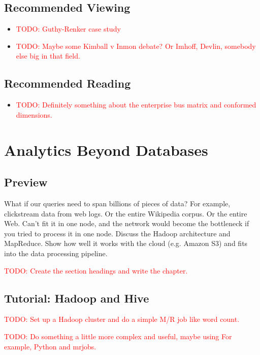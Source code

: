 \documentclass[11pt]{book}
\newcommand{\todo}[1]{\textcolor{red}{TODO: #1}} %
\begin{document}
\section*{Recommended Viewing}
\begin{itemize}
    \item \todo{Guthy-Renker case study}
    \item \todo{Maybe some Kimball v Inmon debate?  Or Imhoff, Devlin, somebody else big in that field.}
\end{itemize}

\section*{Recommended Reading}
\begin{itemize}
    \item \todo{Definitely something about the enterprise bus matrix and conformed dimensions.}
\end{itemize}









\chapter{Analytics Beyond Databases}

\section*{Preview}

What if our queries need to span billions of pieces of data?  For example, clickstream data from web logs.  Or the entire Wikipedia corpus.  Or the entire Web.  Can't fit it in one node, and the network would become the bottleneck if you tried to process it in one node.  Discuss the Hadoop architecture and MapReduce.  Show how well it works with the cloud (e.g. Amazon S3) and fits into the data processing pipeline.

\todo{Create the section headings and write the chapter.}

\section{Tutorial: Hadoop and Hive}

\todo{Set up a Hadoop cluster and do a simple M/R job like word count.}

\todo{Do something a little more complex and useful, maybe using For example, Python and mrjobs.}
\end{document}
